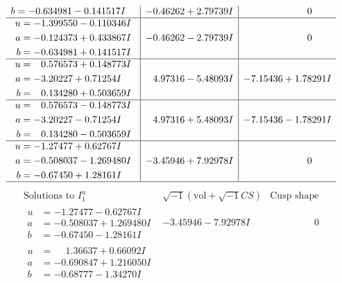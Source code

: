 \documentclass[1p]{elsarticle_modified}
\theoremstyle{definition}
\newcommand{\I}{\sqrt{-1}}
\begin{document}
$$\begin{array}{c|c|c}
\begin{aligned}
b &= -0.634981 - 0.141517 I\end{aligned}
 & -0.46262 + 2.79739 I & \phantom{-0.000000 } 0 \\ \hline\begin{aligned}
u &= -1.399550 - 0.110346 I \\
a &= -0.124373 + 0.433867 I \\
b &= -0.634981 + 0.141517 I\end{aligned}
 & -0.46262 - 2.79739 I & \phantom{-0.000000 } 0 \\ \hline\begin{aligned}
u &= \phantom{-}0.576573 + 0.148773 I \\
a &= -3.20227 + 0.71254 I \\
b &= \phantom{-}0.134280 + 0.503659 I\end{aligned}
 & \phantom{-}4.97316 - 5.48093 I & -7.15436 + 1.78291 I \\ \hline\begin{aligned}
u &= \phantom{-}0.576573 - 0.148773 I \\
a &= -3.20227 - 0.71254 I \\
b &= \phantom{-}0.134280 - 0.503659 I\end{aligned}
 & \phantom{-}4.97316 + 5.48093 I & -7.15436 - 1.78291 I \\ \hline\begin{aligned}
u &= -1.27477 + 0.62767 I \\
a &= -0.508037 - 1.269480 I \\
b &= -0.67450 + 1.28161 I\end{aligned}
 & -3.45946 + 7.92978 I & \phantom{-0.000000 } 0\\
 \hline 
 \end{array}$$\newpage$$\begin{array}{c|c|c}  
\text{Solutions to }I^u_{1}& \I (\text{vol} + \sqrt{-1}CS) & \text{Cusp shape}\\
 \hline 
\begin{aligned}
u &= -1.27477 - 0.62767 I \\
a &= -0.508037 + 1.269480 I \\
b &= -0.67450 - 1.28161 I\end{aligned}
 & -3.45946 - 7.92978 I & \phantom{-0.000000 } 0 \\ \hline\begin{aligned}
u &= \phantom{-}1.36637 + 0.66092 I \\
a &= -0.690847 + 1.216050 I \\
b &= -0.68777 - 1.34270 I\end{aligned}

\end{array}$$
\end{document}
